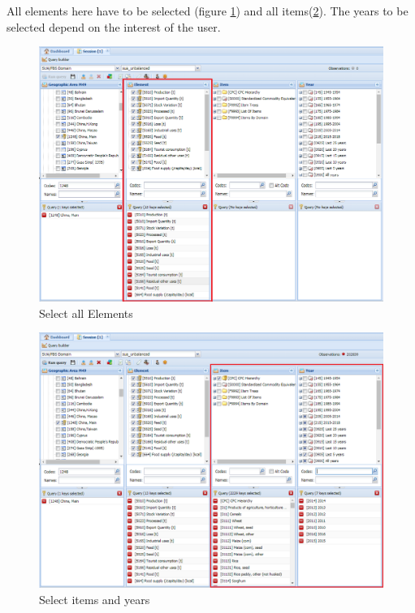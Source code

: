 \documentclass[]{article}
\begin{document}
All elements here have to be selected (figure \ref{fig:f7}) and all
items(\ref{fig:f8}). The years to be selected depend on the interest of
the user.

\begin{figure}[H]

{\centering \includegraphics[width=1\linewidth]{images/pullData/07_selectElement} 

}

\caption{\label{fig:f7}Select all Elements}\label{fig:f7}
\end{figure}

\begin{figure}[H]

{\centering \includegraphics[width=1\linewidth]{images/pullData/08_selectItemYear} 

}

\caption{\label{fig:f8}Select items and years}\label{fig:f8}
\end{figure}
\end{document}
